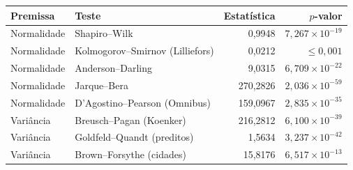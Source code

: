 \begin{tabular}{llrr}
\toprule
Premissa & Teste & Estatística & $p$-valor \\
\midrule
Normalidade & Shapiro--Wilk & 0,9948 & $7{,}267\times10^{-19}$ \\
Normalidade & Kolmogorov--Smirnov (Lilliefors) & 0,0212 & $\le 0,001$ \\
Normalidade & Anderson--Darling & 9,0315 & $6{,}709\times10^{-22}$ \\
Normalidade & Jarque--Bera & 270,2826 & $2{,}036\times10^{-59}$ \\
Normalidade & D'Agostino--Pearson (Omnibus) & 159,0967 & $2{,}835\times10^{-35}$ \\
\addlinespace
Variância & Breusch--Pagan (Koenker) & 216,2812 & $6{,}100\times10^{-39}$ \\
Variância & Goldfeld--Quandt (preditos) & 1,5634 & $3{,}237\times10^{-42}$ \\
Variância & Brown--Forsythe (cidades) & 15,8176 & $6{,}517\times10^{-13}$ \\
\bottomrule
\end{tabular}
